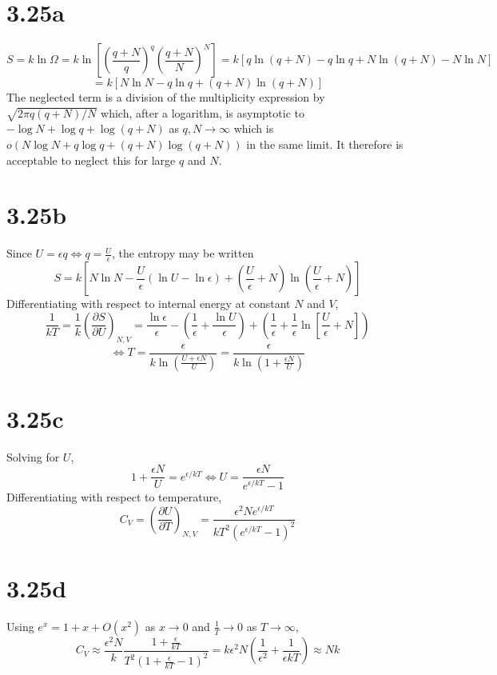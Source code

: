 \documentclass{article}
\begin{document}
\section*{3.25a}
\[S=k\ln\Omega=k\ln\left[  \left( \frac{q+N}{q} \right)^{q}\left( \frac{q+N}{N} \right)^{N} \right]=k\left[ q\ln(q+N)-q\ln q+N\ln(q+N)-N\ln N\right]\]
\[=k[N\ln N-q\ln q+(q+N)\ln(q+N)]\]
The neglected term is a division of the multiplicity expression by $\sqrt{2\pi q(q+N)/N}$ which, after a logarithm, is asymptotic to $-\log N+\log q+\log(q+N)$ as $q,N\to\infty$ which is $o(N\log N+q\log q+(q+N)\log(q+N))$  in the same limit. It therefore is acceptable to neglect this for large $q$ and $N$.

\section*{3.25b}
Since $U=\epsilon q\Leftrightarrow q=\frac{U}{\epsilon}$, the entropy may be written
\[S=k\left[ N\ln N-\frac{U}{\epsilon}\left(  \ln U-\ln\epsilon\right) +\left( \frac{U}{\epsilon}+N \right)\ln\left( \frac{U}{\epsilon}+N \right)\right]\]
Differentiating with respect to internal energy at constant $N$ and $V$,
\[\frac{1}{kT}=\frac{1}{k}\left( \frac{\partial S}{\partial U} \right)_{N,V}=\frac{\ln\epsilon}{\epsilon}-\left(\frac{1}{\epsilon}+\frac{\ln U}{\epsilon}\right)+\left( \frac{1}{\epsilon}+\frac{1}{\epsilon}\ln\left[ \frac{U}{\epsilon}+N \right]\right)\]
\[\Leftrightarrow T=\frac{\epsilon}{k\ln\left( \frac{U+\epsilon N}{U} \right)}=\frac{\epsilon}{k\ln\left( 1+\frac{\epsilon N}{U} \right)}\]

\section*{3.25c}
Solving for $U$,
\[1+\frac{\epsilon N}{U}=e^{\epsilon/kT}\Leftrightarrow U=\frac{\epsilon N}{e^{\epsilon/kT}-1}\]
Differentiating with respect to temperature,
\[C_{V}=\left(\frac{\partial U}{\partial T}\right)_{N,V}=\frac{\epsilon^{2}Ne^{\epsilon/kT}}{kT^{2}(e^{\epsilon/kT}-1)^{2}}\]

\section*{3.25d}
Using $e^{x}=1+x+O(x^{2})$ as $x\to 0$ and $\frac{1}{T}\to 0$ as $T\to\infty$,
\[C_{V}\approx \frac{\epsilon^{2}N}{k}\frac{1+\frac{\epsilon}{kT}}{T^{2}\left( 1+\frac{\epsilon}{kT}-1\right)^{2}}={k\epsilon^{2}N}\left( \frac{1}{\epsilon^{2}}+\frac{1}{\epsilon k T} \right)\approx Nk\]
\end{document}
